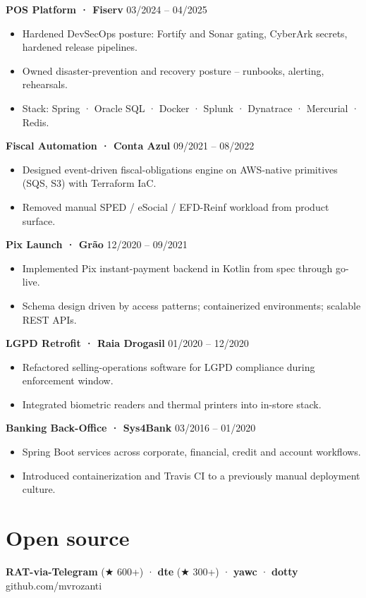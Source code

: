 \documentclass[10pt,a4paper]{article}
\begin{document}
\noindent\textbf{POS Platform · Fiserv} \hfill 03/2024 -- 04/2025
\begin{itemize}
\item Hardened DevSecOps posture: Fortify and Sonar gating, CyberArk secrets, hardened release pipelines.
\item Owned disaster-prevention and recovery posture -- runbooks, alerting, rehearsals.
\item Stack: Spring · Oracle SQL · Docker · Splunk · Dynatrace · Mercurial · Redis.
\end{itemize}

\noindent\textbf{Fiscal Automation · Conta Azul} \hfill 09/2021 -- 08/2022
\begin{itemize}
\item Designed event-driven fiscal-obligations engine on AWS-native primitives (SQS, S3) with Terraform IaC.
\item Removed manual SPED / eSocial / EFD-Reinf workload from product surface.
\end{itemize}

\noindent\textbf{Pix Launch · Grão} \hfill 12/2020 -- 09/2021
\begin{itemize}
\item Implemented Pix instant-payment backend in Kotlin from spec through go-live.
\item Schema design driven by access patterns; containerized environments; scalable REST APIs.
\end{itemize}

\noindent\textbf{LGPD Retrofit · Raia Drogasil} \hfill 01/2020 -- 12/2020
\begin{itemize}
\item Refactored selling-operations software for LGPD compliance during enforcement window.
\item Integrated biometric readers and thermal printers into in-store stack.
\end{itemize}

\noindent\textbf{Banking Back-Office · Sys4Bank} \hfill 03/2016 -- 01/2020
\begin{itemize}
\item Spring Boot services across corporate, financial, credit and account workflows.
\item Introduced containerization and Travis CI to a previously manual deployment culture.
\end{itemize}

\section{Open source}
\noindent\textbf{RAT-via-Telegram} (★ 600+) · \textbf{dte} (★ 300+) · \textbf{yawc} · \textbf{dotty} \hfill github.com/mvrozanti
\end{document}
